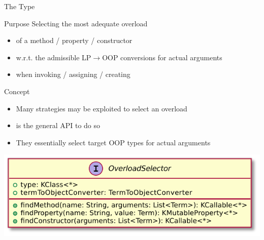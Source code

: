 \documentclass[handout]{beamer}
\begin{document}
\begin{frame}[allowframebreaks]{The  Type}
    \begin{block}{Purpose}
        Selecting the \alert{most adequate overload}
        \begin{itemize}
            \item of a method / property / constructor
            \item w.r.t. the admissible LP$\rightarrow$OOP conversions for \alert{actual} arguments
            \item when invoking / assigning / creating
        \end{itemize}
    \end{block}

    \begin{alertblock}{Concept}
        \begin{itemize}
            \item Many \alert{strategies} may be exploited to select an overload
            \item {} is the general API to do so
            \item They essentially select \alert{target OOP types} for actual arguments
        \end{itemize}
    \end{alertblock}

    \framebreak

    \begin{center}
        \includegraphics[width=.5\linewidth]{img/OverloadSelector.pdf}
    \end{center}

    \framebreak


\end{frame}
\end{document}
